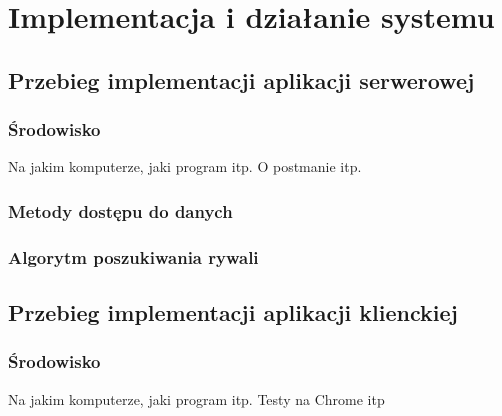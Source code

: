 \chapter{Implementacja i działanie systemu}

\section{Przebieg implementacji aplikacji serwerowej}

\subsection{Środowisko}

Na jakim komputerze, jaki program itp. O postmanie itp.

\subsection{Metody dostępu do danych}
\begin{comment}

JPA, Paginacja dla dużych zbiorów danych, Specification

\end{comment}

\subsection{Algorytm poszukiwania rywali}

\section{Przebieg implementacji aplikacji klienckiej}

\subsection{Środowisko}

Na jakim komputerze, jaki program itp. Testy na Chrome itp